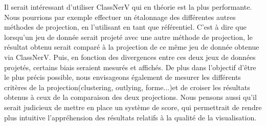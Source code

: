 Il serait intéressant d'utiliser ClassNerV qui en théorie est la plus performante. Nous pourrions par exemple 
effectuer un étalonnage des différentes autres méthodes de projection, en l'utilisant en tant que référentiel. 
C'est à dire que lorsqu'un jeu de donnée serait projeté avec une autre méthode de projection, le résultat obtenu serait comparé à la projection de ce même jeu de donnée obtenue via ClassNerV.
Puis, en fonction des divergences entre ces deux jeux de données projetés, certains biais seraient mesurés et affichés.
De plus dans l'objectif d'être le plus précis possible, nous envisageons également de mesurer les différents critères de la projection(clustering, outlying, forme...)et de croiser les résultats obtenus à ceux de la comparaison des deux projections.
Nous pensons aussi qu'il serait judicieux de mettre en place un système de score, qui permettrait de rendre plus intuitive l'appréhension des résultats relatifs à la qualité de la visualisation. 


